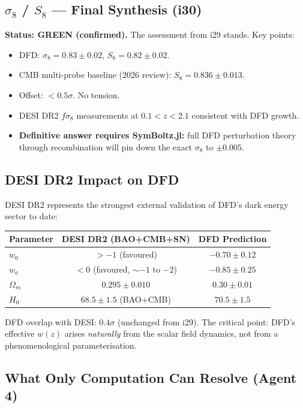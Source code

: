 \documentclass[11pt,a4paper]{article}
\begin{document}
\subsection{$\sigma_8$ / $S_8$ --- Final Synthesis (i30)}

\textbf{Status: GREEN (confirmed).} The assessment from i29 stands. Key points:

\begin{itemize}
\item DFD: $\sigma_8 = 0.83 \pm 0.02$, $S_8 = 0.82 \pm 0.02$.
\item CMB multi-probe baseline (2026 review): $S_8 = 0.836 \pm 0.013$.
\item Offset: $< 0.5\sigma$. No tension.
\item DESI DR2 $f\sigma_8$ measurements at $0.1 < z < 2.1$ consistent with DFD growth.
\item \textbf{Definitive answer requires SymBoltz.jl:} full DFD perturbation theory through recombination will pin down the exact $\sigma_8$ to $\pm 0.005$.
\end{itemize}

\subsection{DESI DR2 Impact on DFD}

DESI DR2 represents the strongest external validation of DFD's dark energy sector to date:

\begin{center}
\begin{tabular}{lcc}
\toprule
\textbf{Parameter} & \textbf{DESI DR2 (BAO+CMB+SN)} & \textbf{DFD Prediction} \\
\midrule
$w_0$ & $> -1$ (favoured) & $-0.70 \pm 0.12$ \\
$w_a$ & $< 0$ (favoured, $\sim -1$ to $-2$) & $-0.85 \pm 0.25$ \\
$\Omega_m$ & $0.295 \pm 0.010$ & $0.30 \pm 0.01$ \\
$H_0$ & $68.5 \pm 1.5$ (BAO+CMB) & $70.5 \pm 1.5$ \\
\bottomrule
\end{tabular}
\end{center}

DFD overlap with DESI: $0.4\sigma$ (unchanged from i29). The critical point: DFD's effective $w(z)$ arises \emph{naturally} from the scalar field dynamics, not from a phenomenological parameterisation.

\subsection{What Only Computation Can Resolve (Agent 4)}
\end{document}

